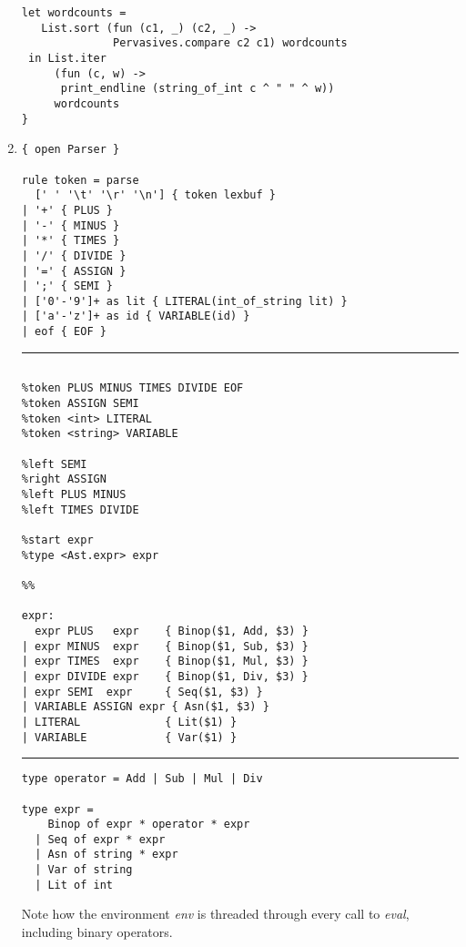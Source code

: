 \documentclass[twocolumn]{article}
\begin{document}
\begin{enumerate}
\begin{lstlisting}[morekeywords={rule,parse,eof}]
 let wordcounts =
   List.sort (fun (c1, _) (c2, _) ->
              Pervasives.compare c2 c1) wordcounts
 in List.iter
     (fun (c, w) ->
      print_endline (string_of_int c ^ " " ^ w))
     wordcounts
}
\end{lstlisting}

\newpage

\item

\begin{lstlisting}[language={},
morekeywords={open,rule,parse,as,eof}]
{ open Parser }

rule token = parse
  [' ' '\t' '\r' '\n'] { token lexbuf }
| '+' { PLUS }
| '-' { MINUS }
| '*' { TIMES }
| '/' { DIVIDE }
| '=' { ASSIGN }
| ';' { SEMI }
| ['0'-'9']+ as lit { LITERAL(int_of_string lit) }
| ['a'-'z']+ as id { VARIABLE(id) }
| eof { EOF }
\end{lstlisting}

\hrule

\begin{lstlisting}[language={},
morekeywords={open,token,left,right,start,type,of,int}]
%{ open Ast %}

%token PLUS MINUS TIMES DIVIDE EOF
%token ASSIGN SEMI
%token <int> LITERAL
%token <string> VARIABLE

%left SEMI
%right ASSIGN
%left PLUS MINUS
%left TIMES DIVIDE

%start expr
%type <Ast.expr> expr

%%

expr:
  expr PLUS   expr    { Binop($1, Add, $3) }
| expr MINUS  expr    { Binop($1, Sub, $3) }
| expr TIMES  expr    { Binop($1, Mul, $3) }
| expr DIVIDE expr    { Binop($1, Div, $3) }
| expr SEMI  expr     { Seq($1, $3) }
| VARIABLE ASSIGN expr { Asn($1, $3) }
| LITERAL             { Lit($1) }
| VARIABLE            { Var($1) }
\end{lstlisting}

\hrule

\begin{lstlisting}
type operator = Add | Sub | Mul | Div

type expr =
    Binop of expr * operator * expr
  | Seq of expr * expr
  | Asn of string * expr
  | Var of string
  | Lit of int
\end{lstlisting}

\newpage

Note how the environment \emph{env} is threaded through every call to
\emph{eval}, including binary operators.


\end{enumerate}
\end{document}
